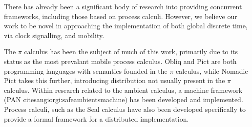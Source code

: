 There has already been a significant body of research into providing
concurrent frameworks, including those based on process calculi.
However, we believe our work to be novel in approaching the
implementation of both global discrete time, via clock signalling, and
mobility.

The $\pi$ calculus has been the subject of much of this work, primarily
due to its status as the most prevalant mobile process calculus.  Obliq
\cite{obliq} and Pict \cite{daveturner:phd} are both programming
languages with semantics founded in the $\pi$ calculus, while Nomadic
Pict \cite{wojciechowski:phd} takes this further, introducing
distribution not usually present in the $\pi$ calculus.  Within research
related to the ambient calculus, a machine framework (PAN
cite{sangiorgi:safeambientsmachine}) has been developed and
implemented.  Process calculi, such as the Seal calculus \cite{seal}
have also been developed specifically to provide a formal framework for
a distributed implementation.
